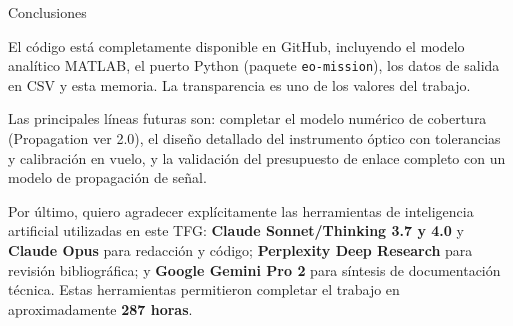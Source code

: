 \documentclass[10pt, aspectratio=169]{beamer}
\begin{document}
\begin{frame}{Conclusiones}
{    \medskip
    El código está completamente disponible en GitHub, incluyendo el modelo analítico MATLAB,
    el puerto Python (paquete \texttt{eo-mission}), los datos de salida en CSV y esta memoria.
    La transparencia es uno de los valores del trabajo.

    \medskip
    Las principales líneas futuras son: completar el modelo numérico de cobertura (Propagation
    ver 2.0), el diseño detallado del instrumento óptico con tolerancias y calibración en vuelo,
    y la validación del presupuesto de enlace completo con un modelo de propagación de señal.

    \medskip
    Por último, quiero agradecer explícitamente las herramientas de inteligencia artificial
    utilizadas en este TFG: \textbf{Claude Sonnet/Thinking 3.7 y 4.0} y \textbf{Claude Opus}
    para redacción y código; \textbf{Perplexity Deep Research} para revisión bibliográfica;
    y \textbf{Google Gemini Pro 2} para síntesis de documentación técnica. Estas herramientas
    permitieron completar el trabajo en aproximadamente \textbf{287 horas}.
  }
\end{frame}
\end{document}
